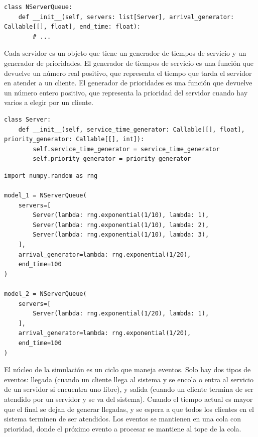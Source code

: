 \documentclass{article}
\begin{document}
\begin{lstlisting}[style=python, caption={Constructor de clase NServerQueue}]
class NServerQueue:
    def __init__(self, servers: list[Server], arrival_generator: Callable[[], float], end_time: float):
        # ...
\end{lstlisting}

Cada servidor es un objeto que tiene un generador de tiempos de servicio y un generador de prioridades. El generador de tiempos de servicio es una función que devuelve un número real positivo, que representa el tiempo que tarda el servidor en atender a un cliente. El generador de prioridades es una función que devuelve un número entero positivo, que representa la prioridad del servidor cuando hay varios a elegir por un cliente.

\begin{lstlisting}[style=python, caption={Clase Server}]
class Server:
    def __init__(self, service_time_generator: Callable[[], float], priority_generator: Callable[[], int]):
        self.service_time_generator = service_time_generator
        self.priority_generator = priority_generator
\end{lstlisting}

\begin{lstlisting}[style=python, caption={Ejemplo de diferentes combinaciones de servidores}]
import numpy.random as rng

model_1 = NServerQueue(
    servers=[
        Server(lambda: rng.exponential(1/10), lambda: 1),
        Server(lambda: rng.exponential(1/10), lambda: 2),
        Server(lambda: rng.exponential(1/10), lambda: 3),
    ],
    arrival_generator=lambda: rng.exponential(1/20),
    end_time=100
)

model_2 = NServerQueue(
    servers=[
        Server(lambda: rng.exponential(1/20), lambda: 1),
    ],
    arrival_generator=lambda: rng.exponential(1/20),
    end_time=100
)
\end{lstlisting}

El núcleo de la simulación es un ciclo que maneja eventos. Solo hay dos tipos de eventos: llegada (cuando un cliente llega al sistema y se encola o entra al servicio de un servidor si encuentra uno libre), y salida (cuando un cliente termina de ser atendido por un servidor y se va del sistema). Cuando el tiempo actual es mayor que el final se dejan de generar llegadas, y se espera a que todos los clientes en el sistema terminen de ser atendidos. Los eventos se mantienen en una cola con prioridad, donde el próximo evento a procesar se mantiene al tope de la cola.
\end{document}
